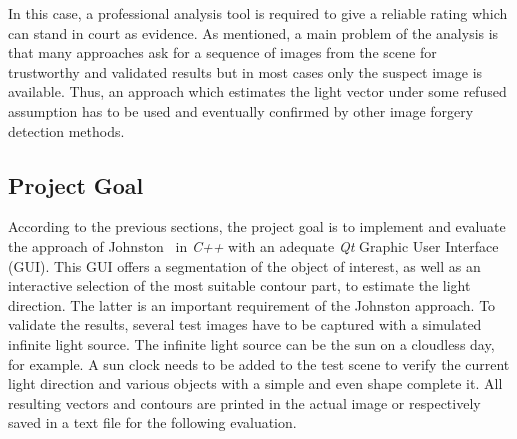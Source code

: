 In this case, a professional analysis tool is required to give a reliable rating which can stand in court as evidence. As mentioned, a main problem of the analysis is that many approaches ask for a sequence of images from the scene for trustworthy and validated results but in most cases only the suspect image is available. Thus, an approach which estimates the light vector under some refused assumption has to be used and eventually confirmed by other image forgery detection methods. 

\subsection{Project Goal}\label{sec:Project Goal}
According to the previous sections, the project goal is to implement and evaluate the approach of Johnston~\cite{Johnson} in \textit{C++} with an adequate \textit{Qt} Graphic User Interface (GUI). This GUI offers a segmentation of the object of interest, as well as an interactive selection of the most suitable contour part, to estimate the light direction. The latter is an important requirement of the Johnston approach. To validate the results, several test images have to be captured with a simulated infinite light source. The infinite light source can be the sun on a cloudless day, for example. A sun clock needs to be added to the test scene to verify the current light direction and various objects with a simple and even shape complete it. All resulting vectors and contours are printed in the actual image or respectively saved in a text file for the following evaluation.



\newpage


















